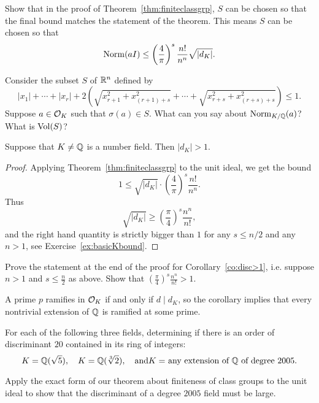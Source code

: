 \begin{exercise}\label{ex:canchooseSright}
	Show that in the proof of Theorem~\ref{thm:finiteclassgrp},
	$S$ can be chosen so that the final bound matches the statement
	of the theorem. This means $S$ can be chosen so that
	$$
		\operatorname{Norm}(aI)
		\leq
		\left(\frac{4}{\pi}\right)^s \frac{n!}{n^n}\sqrt{\left|d_K\right|}.
	$$
	\begin{hint}
		Consider the subset $S$ of $\mathbb{R}^n$ defined by
		$$
			|x_1| + \cdots + |x_r| + 2\left(\sqrt{
			x_{r+1}^2+x_{(r+1)+s}^2} + \cdots + \sqrt{
			x_{r+s}^2+x_{(r+s)+s}^2}\right) \leq 1.
		$$
		Suppose $a\in\mathcal{O}_K$ such that $\sigma(a)\in S$.
		What can you say about $\operatorname{Norm}_{K/\mathbb{Q}}(a)$? What is $\operatorname{Vol}(S)$?
	\end{hint}
\end{exercise}

\begin{corollary}\label{co:disc>1}
	Suppose that $K\neq \mathbb{Q}$ is a number field.  Then $|d_K|>1$.
\end{corollary}
\begin{proof}
	Applying Theorem~\ref{thm:finiteclassgrp} to the unit ideal,
	we get the bound
	$$
		 1\leq \sqrt{|d_K|}\cdot \left(\frac{4}{\pi}\right)^s\frac{n!}{n^n}.
	$$
	Thus
	$$
		\sqrt{|d_K|}
		\geq
		\left(\frac{\pi}{4}\right)^s\frac{n^n}{n!},
	$$
	and the right hand quantity is strictly bigger than $1$ for
	any $s\leq n/2$ and any $n>1$, see Exercise~\ref{ex:basicKbound}.
\end{proof}

\begin{exercise}\label{ex:basicKbound}
	Prove the statement at the end of the proof for Corollary~\ref{co:disc>1},
	i.e. suppose $n>1$ and $s\leq \frac{n}{2}$ as above. Show that
	$\left(\frac{\pi}{4}\right)^s\frac{n^n}{n!} > 1.$
\end{exercise}

A prime $p$ ramifies in $\mathcal{O}_K$ if and only if $d\mid d_K$,
so the corollary implies that every nontrivial extension of $\mathbb{Q}$
is ramified at some prime.

\begin{exercise}
	For each of the following three fields, determining if there is
	an order of discriminant $20$ contained in its ring of integers:
	$$
		K = \mathbb{Q}(\sqrt{5}), \quad K=\mathbb{Q}(\sqrt[3]{2}), \quad\text{and}
		\text{$K = $ any extension of $\mathbb{Q}$ of degree $2005$}.
	$$

	\begin{hint}
		Apply the exact form of our theorem about finiteness of class groups
		to the unit ideal to show that the discriminant of a degree $2005$
		field must be large.
	\end{hint}
\end{exercise}

